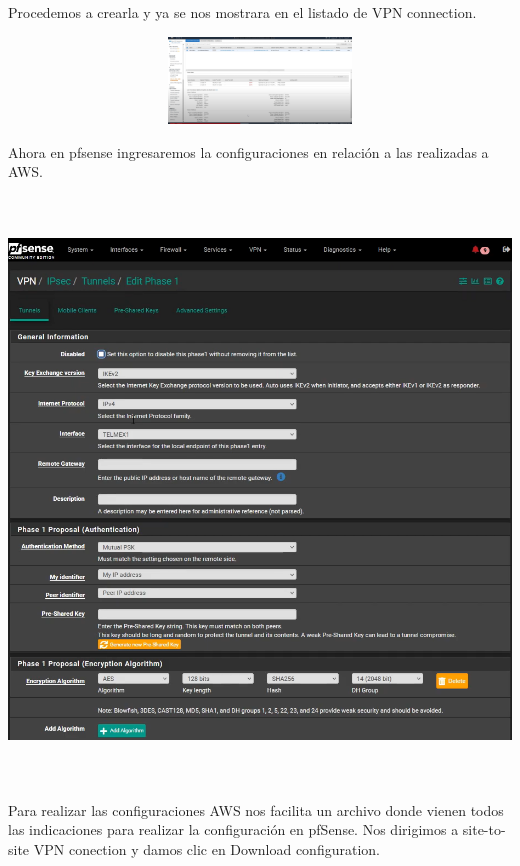 \documentclass{article} %
\begin{document}
\noindent 

\noindent 

\noindent Procedemos a crearla y ya se nos mostrara en el listado de VPN connection. 

\noindent 

\noindent \includegraphics*[width=6.51in, height=0.91in, trim=0.00in 2.80in 1.32in 0.00in]{image25}

\noindent 

\noindent 

\noindent Ahora en pfsense ingresaremos la configuraciones en relaci\'{o}n a las realizadas a AWS.

\noindent 

\noindent \includegraphics*[width=6.13in, height=6.11in]{image26}

\noindent 

\noindent Para realizar las configuraciones AWS nos facilita un archivo donde vienen todos las indicaciones para realizar la configuraci\'{o}n en pfSense.  Nos dirigimos a site-to-site VPN conection y damos clic en Download configuration. 
\end{document}
